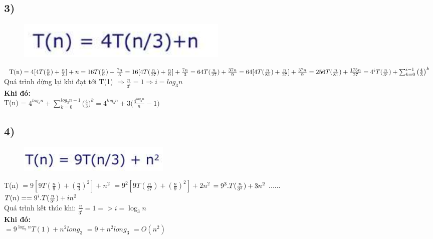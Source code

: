 \documentclass[10pt,a4paper]{article}
\begin{document}
\subsection*{3)}
\begin{figure}[H]
    \centering
    \includegraphics[scale=.6]{images/33.png}
    \label{fig:my_label}
\end{figure}
$
\text{T(n)} = 4[4T(\frac{n}{9})+\frac{n}{3}] + n = 16T(\frac{n}{9}) + \frac{7n}{3} \\
= 16[4T(\frac{n}{27})+\frac{n}{9}] + \frac{7n}{3} = 64T(\frac{n}{27}) + \frac{37n}{9} \\ 
= 64[4T(\frac{n}{81})+\frac{n}{27}] + \frac{37n}{9} = 256T(\frac{n}{81}) + \frac{175n}{27} \\
= 4^iT(\frac{n}{3^i}) + \sum_{k=0}^{i-1}{\big(\frac{4}{3}\big)^k}$ \\
Quá trình dừng lại khi đạt tới T(1) $\Rightarrow \frac{n}{3^i} = 1 \Rightarrow i = log_3{n}$ \\
\textbf{Khi đó: }\\
T(n) = $4^{log_3{n}} + \sum_{k=0}^{log_3{n}-1}{\big(\frac{4}{3}\big)^k} = 4^{log_3{n}} + 3\big(\frac{4^{log_3{n}}}{n}-1\big)$
\subsection*{4)}
\begin{figure}[H]
    \centering
    \includegraphics[scale=.7]{images/3.4.png}
    \label{fig:my_label}
\end{figure}
T(n) 
$=9[9T(\frac{n}{9}) + (\frac{n}{3})^2] + n^2$ $=9^2[9T(\frac{n}{27}) + (\frac{n}{9})^2] + 2n^2$ 
$= 9^3.T(\frac{n}{3^3}) +3n^2\\$
......\\
$T(n) = = 9^i.T(\frac{n}{3^i}) +in^2\\$ \\

Quá trình kết thúc khi: $\frac{n}{3^i} = 1 => i = \log_{3}n$ \\
\textbf{Khi đó:}
\\
$= 9^{\log_{3}n}T(1)+n^2long_{3}$ 
$= 9+n^2long_{3}$ 
$= O(n^2)$ 
\end{document}
